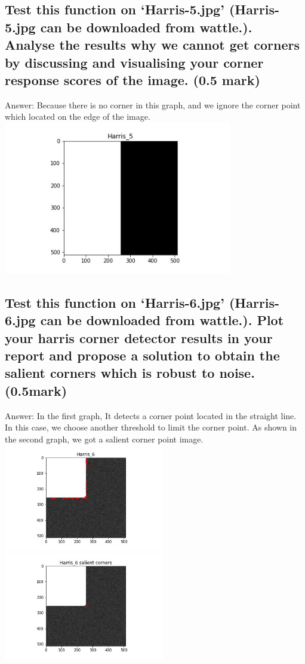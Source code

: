 \documentclass[]{article}
\begin{document}
\subsection{Test this function on ‘Harris-5.jpg’ (Harris-5.jpg can be downloaded from wattle.). Analyse the results why we cannot get corners by discussing and visualising your corner response scores of the image. (0.5 mark)}
Answer: Because there is no corner in this graph, and we ignore the corner point which located on the edge of the image.\\
\includegraphics[width=10cm]{Harris_5_.jpg}
\subsection{Test this function on ‘Harris-6.jpg’ (Harris-6.jpg can be downloaded from wattle.).
	Plot your harris corner detector results in your report and propose a solution to obtain the salient corners which is robust to noise. (0.5mark)}
Answer: In the first graph, It detects a corner point located in the straight line. In this case, we choose another threshold to limit the corner point. As shown in the second graph, we got a salient corner point image.\\
\includegraphics[width=7cm]{Harris_6_.jpg}
\includegraphics[width=7cm]{Harris_6salient.jpg}
\end{document}
